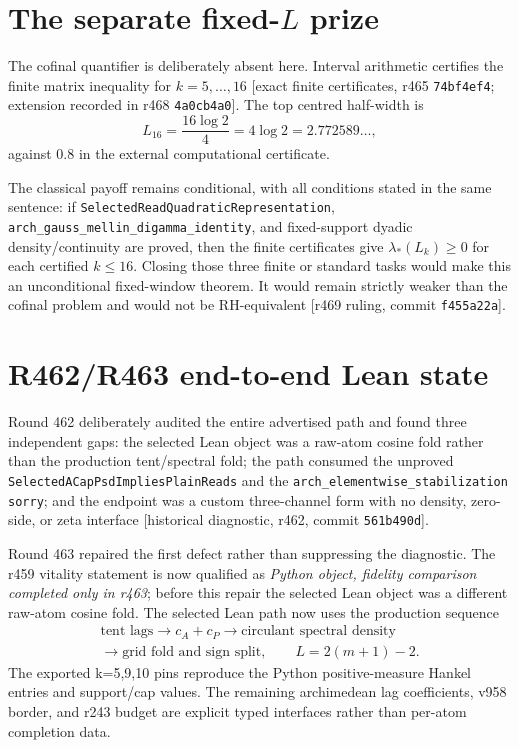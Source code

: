 \documentclass[11pt]{article}
\theoremstyle{remark}
\newcommand{\gr}[1]{\textnormal{\small[#1]}}
\begin{document}
\section{The separate fixed-\texorpdfstring{$L$}{L} prize}
\label{sec:fixedL}

The cofinal quantifier is deliberately absent here.  Interval
arithmetic certifies the finite matrix inequality for
$k=5,\ldots,16$ \gr{exact finite certificates, r465
\texttt{74bf4ef4}; extension recorded in r468 \texttt{4a0cb4a0}}.
The top centred half-width is
\[
L_{16}=\frac{16\log2}{4}=4\log2=2.772589\ldots,
\]
against $0.8$ in the external computational certificate.

The classical payoff remains conditional, with all conditions stated
in the same sentence: if
\texttt{SelectedReadQuadraticRepresentation},
\texttt{arch\_gauss\_mellin\_digamma\_identity}, and fixed-support
dyadic density/continuity are proved, then the finite certificates
give $\lambda_*(L_k)\ge0$ for each certified $k\le16$.  Closing
those three finite or standard tasks would make this an
unconditional fixed-window theorem.  It would remain strictly
weaker than the cofinal problem and would not be RH-equivalent
\gr{r469 ruling, commit \texttt{f455a22a}}.

\section{R462/R463 end-to-end Lean state}\label{sec:r463-fidelity}

Round 462 deliberately audited the entire advertised path and found
three independent gaps: the selected Lean object was a raw-atom
cosine fold rather than the production tent/spectral fold; the path
consumed the unproved
\texttt{SelectedACapPsdImpliesPlainReads} and the
\texttt{arch\_elementwise\_stabilization} \texttt{sorry}; and the
endpoint was a custom three-channel form with no density, zero-side,
or zeta interface \gr{historical diagnostic, r462,
commit \texttt{561b490d}}.

Round 463 repaired the first defect rather than suppressing the
diagnostic.  The r459 vitality statement is now qualified as
\emph{Python object, fidelity comparison completed only in r463};
before this repair the selected Lean object was a different raw-atom
cosine fold.  The selected Lean path now uses the production sequence
\[
  \begin{gathered}
  \text{tent lags}\longrightarrow c_A+c_P
  \longrightarrow\text{circulant spectral density}\\
  {}\longrightarrow\text{grid fold and sign split},
  \qquad L=2(m+1)-2.
  \end{gathered}
\]
The exported k=5,9,10 pins reproduce the Python positive-measure
Hankel entries and support/cap values.  The remaining archimedean
lag coefficients, v958 border, and r243 budget are explicit typed
interfaces rather than per-atom completion data.
\end{document}
